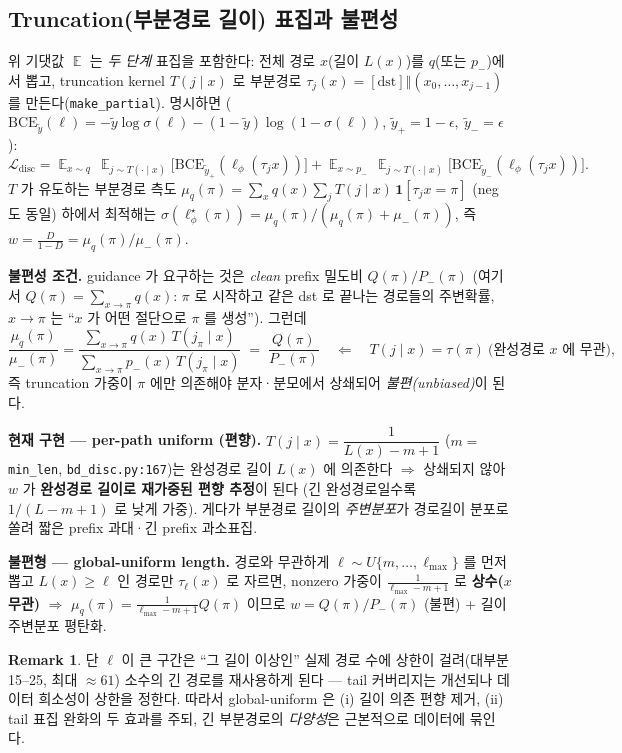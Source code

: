 \documentclass[11pt]{article}
\newcommand{\code}[1]{\texttt{\small #1}}
\DeclareMathOperator*{\E}{\mathbb{E}}
\theoremstyle{definition}
\newtheorem{remark}{Remark}
\begin{document}
\subsection*{Truncation(부분경로 길이) 표집과 불편성}
위 기댓값 $\E$ 는 \emph{두 단계} 표집을 포함한다: 전체 경로 $x$(길이 $L(x)$)를 $q$(또는
$p_{-}$)에서 뽑고, truncation kernel $T(j\mid x)$ 로 부분경로
$\tau_j(x)=[\text{dst}]\Vert(x_0,\dots,x_{j-1})$ 를 만든다(\code{make\_partial}). 명시하면
($\mathrm{BCE}_{\tilde y}(\ell)=-\tilde y\log\sigma(\ell)-(1-\tilde y)\log(1-\sigma(\ell))$,
$\tilde y_+{=}1-\epsilon,\ \tilde y_-{=}\epsilon$):
\begin{equation}
\mathcal L_{\text{disc}}
=\E_{x\sim q}\,\E_{j\sim T(\cdot\mid x)}\big[\mathrm{BCE}_{\tilde y_+}(\ell_\phi(\tau_j x))\big]
+\E_{x\sim p_{-}}\,\E_{j\sim T(\cdot\mid x)}\big[\mathrm{BCE}_{\tilde y_-}(\ell_\phi(\tau_j x))\big].
\end{equation}
$T$ 가 유도하는 부분경로 측도 $\mu_q(\pi)=\sum_x q(x)\sum_j T(j\mid x)\,\mathbf 1[\tau_j x{=}\pi]$
(neg 도 동일) 하에서 최적해는 $\sigma(\ell^\star_\phi(\pi))=\mu_q(\pi)/(\mu_q(\pi){+}\mu_{-}(\pi))$,
즉 $w=\tfrac{D}{1-D}=\mu_q(\pi)/\mu_{-}(\pi)$.

\textbf{불편성 조건.} guidance 가 요구하는 것은 \emph{clean} prefix 밀도비 $Q(\pi)/P_{-}(\pi)$
(여기서 $Q(\pi)=\sum_{x\to\pi}q(x)$: $\pi$ 로 시작하고 같은 dst 로 끝나는 경로들의 주변확률,
$x\to\pi$ 는 ``$x$ 가 어떤 절단으로 $\pi$ 를 생성''). 그런데
\begin{equation}
\frac{\mu_q(\pi)}{\mu_{-}(\pi)}
=\frac{\sum_{x\to\pi} q(x)\,T(j_\pi\mid x)}{\sum_{x\to\pi} p_{-}(x)\,T(j_\pi\mid x)}
\;=\;\frac{Q(\pi)}{P_{-}(\pi)}\quad\Longleftarrow\quad T(j\mid x)=\tau(\pi)\ \text{(완성경로 $x$ 에 무관)},
\end{equation}
즉 truncation 가중이 $\pi$ 에만 의존해야 분자·분모에서 상쇄되어 \emph{불편(unbiased)}이 된다.

\textbf{현재 구현 — per-path uniform (편향).} $T(j\mid x)=\dfrac{1}{L(x)-m+1}$
($m{=}$\code{min\_len}, \code{bd\_disc.py:167})는 완성경로 길이 $L(x)$ 에 의존한다
$\Rightarrow$ 상쇄되지 않아 $w$ 가 \textbf{완성경로 길이로 재가중된 편향 추정}이 된다
(긴 완성경로일수록 $1/(L{-}m{+}1)$ 로 낮게 가중). 게다가 부분경로 길이의 \emph{주변분포}가
경로길이 분포로 쏠려 짧은 prefix 과대·긴 prefix 과소표집.

\textbf{불편형 — global-uniform length.} 경로와 무관하게 $\ell\sim U\{m,\dots,\ell_{\max}\}$ 를
먼저 뽑고 $L(x)\ge\ell$ 인 경로만 $\tau_\ell(x)$ 로 자르면, nonzero 가중이
$\tfrac{1}{\ell_{\max}-m+1}$ 로 \textbf{상수($x$ 무관)} $\Rightarrow$
$\mu_q(\pi)=\tfrac{1}{\ell_{\max}-m+1}Q(\pi)$ 이므로 $w=Q(\pi)/P_{-}(\pi)$ (불편) + 길이
주변분포 평탄화.
\begin{remark}
단 $\ell$ 이 큰 구간은 ``그 길이 이상인'' 실제 경로 수에 상한이 걸려(대부분 15--25, 최대
$\approx 61$) 소수의 긴 경로를 재사용하게 된다 — tail 커버리지는 개선되나 데이터 희소성이
상한을 정한다. 따라서 global-uniform 은 (i) 길이 의존 편향 제거, (ii) tail 표집 완화의 두
효과를 주되, 긴 부분경로의 \emph{다양성}은 근본적으로 데이터에 묶인다.
\end{remark}
\end{document}
